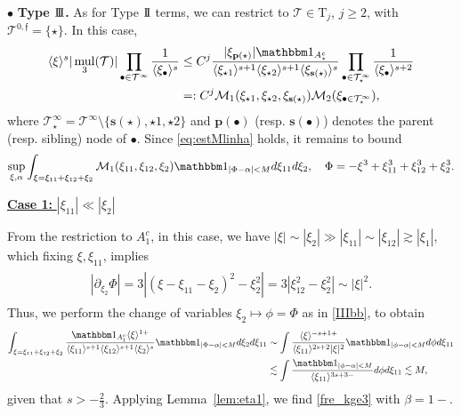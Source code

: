 \documentclass[a4paper,
11pt,  reqno]{amsart}
\newcommand{\II}{\textup{I \hspace{-2.9mm} I} }
\newcommand{\III}{\textup{I \hspace{-2.9mm} I \hspace{-2.9mm} I}}
\newcommand{\5}{\textup{V}}
\newcommand{\noi}{\noindent}
\newcommand{\ind}{\mathbbm 1}
\newcommand{\les}{\lesssim}
\theoremstyle{remark}
\newcommand{\bul}{\bullet}
\newcommand{\TT}{\mathcal{T}}
\newcommand{\Tr}{\mathrm{T}}
\newcommand{\al}{\alpha}
\newcommand{\be}{\beta}
\newcommand{\pb}{\mathbf{p}}
\newcommand{\sbf}{\mathbf{s}}
\newcommand{\ges}{\gtrsim}
\newcommand{\jb}[1]
{\langle #1 \rangle}
\newcommand{\ff}{\mathfrak{f}}
\DeclareMathOperator{\mul}{mul}
\numberwithin{equation}{section}
\numberwithin{theorem}{section}
\begin{document}
\smallskip 
    
\noi
$\bul$ \textbf{Type $\III$.} As for Type $\II$ terms, we can restrict to $\TT\in \Tr_j$, $j\ge 2$,  with $\TT^{0,\ff}=\{\star\}$. In this case,
\begin{align}
    \jb{\xi}^s | \mul_3 (\TT)| 
    \prod_{\bul \in \TT^\infty} \frac{1}{\jb{\xi_\bul}^s}
    &
    \le 
    {C^j}
    \frac{|\xi_{\pb(\star)}|  \ind_{A_\star^c} }{ \jb{\xi_{\star1}}^{s+1} \jb{\xi_{\star2}}^{s+1} \jb{\xi_{\sbf(\star)}}^s} \prod_{\bul \in \TT^\infty_\star} \frac{1}{\jb{\xi_\bul}^{s+2}}
    \\
    &=: {C^j} 
    \mathcal{M}_1(\xi_{\star1}, \xi_{\star2}, \xi_{\sbf(\star)})\mathcal{M}_2(\xi_{\bul\in \TT^\infty_\star}) 
    ,
\end{align}
where $\TT_\star^\infty=\TT^\infty\setminus\{\sbf(\star),\star1,\star2\}$ and $\pb(\bul)$ (resp. $\sbf(\bul)$) denotes the parent (resp. sibling) node of $\bul$. Since \eqref{eq:estMlinha} holds, it remains to bound
\begin{align}
\label{IIIbb}
\sup_{\xi, \alpha}
\int_{\xi=\xi_{11}+\xi_{12}+\xi_2} \mathcal{M}_1(\xi_{11}, \xi_{12}, \xi_{2})\ind_{|\Phi - \al| < M} d\xi_{11} d\xi_{2},\quad \Phi=-\xi^3+\xi_{11}^3+\xi_{12}^3+\xi_2^3.
\end{align}



\smallskip
\noi
\underline{\textbf{Case 1:} $|\xi_{11}| \ll |\xi_2|$}

{From the restriction to $A_1^c$,}
in this case, we have $|\xi| \sim |\xi_2| \gg  |\xi_{11}| \sim |\xi_{12}| \ges |\xi_1|$, which fixing $\xi, \xi_{11}$, implies
\begin{align}\label{IIIb}
\begin{split}
| 
\partial_{\xi_{2}} \Phi|
= 3 | (\xi-\xi_{11}-\xi_2)^2 - \xi_2^2|
=3|\xi_{12}^2 - \xi_2^2|
\sim |\xi|^2. 
\end{split}
\end{align}
Thus, we perform the change of variables $\xi_2 \mapsto \phi = \Phi$ as in \eqref{IIIbb}, to obtain
\begin{align}
\int_{\xi=\xi_{11} + \xi_{12} + \xi_2} \frac{ \ind_{A_1^c} \jb{\xi}^{1 + }  }{ \jb{\xi_{11}}^{s+1  } \jb{\xi_{12}}^{s+1} \jb{\xi_{2}}^s }
\ind_{|\Phi - \al| < M}
 d\xi_2 d\xi_{11}
&
\sim \int \frac{ \jb{\xi}^{  - s +  1 + } }{ \jb{\xi_{11}}^{2s+2} |\xi|^2  } \ind_{|\phi - \al| < M } d\phi d\xi_{11} 
\\
&
\les \int \frac{\ind_{|\phi - \al|< M }}{ \jb{\xi_{11}}^{3s+3 - } } d\phi d\xi_{11} \les M, 
\end{align}
given that $s>-\frac23$. Applying Lemma~\ref{lem:eta1}, we find \eqref{fre_kge3} with $\be=1-$. 
\end{document}
